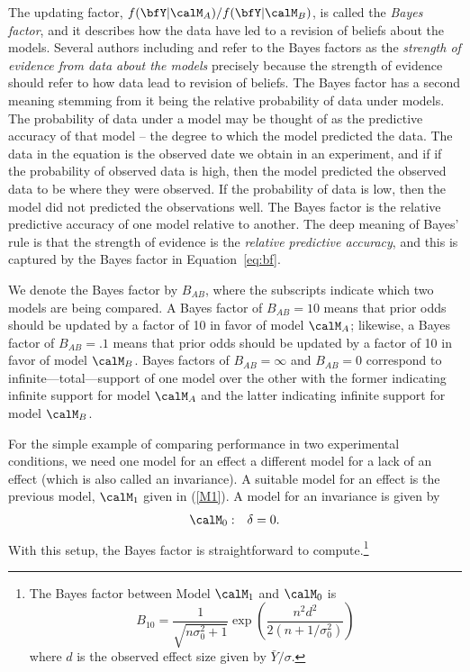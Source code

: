 The updating factor, $f(\bfY | \calM_A)/f(\bfY | \calM_B)$, is called the {\em Bayes factor}, and it  describes how the data have led to a revision of beliefs about the models.  Several authors including \cite{Jeffreys:1961} and  refer to the Bayes factors as the {\em strength of evidence from data about the models} precisely because the strength of evidence should refer to how data lead to revision of beliefs.  The Bayes factor has a second meaning stemming from it being the relative probability of data under models.  The probability of data under a model may be thought of as the predictive accuracy of that model -- the degree to which the model predicted the data.  The data in the equation is the observed date we obtain in an experiment, and if if the probability of observed data is high, then the model predicted the observed data to be where they were observed.  If the probability of data is low, then the model did not predicted the observations well.  The Bayes factor is the relative predictive accuracy of one model relative to another.  The deep meaning of Bayes' rule is that the strength of evidence is the \emph{relative predictive accuracy}, and this is captured by the Bayes factor in Equation~\ref{eq:bf}.

We denote the Bayes factor by $B_{AB}$, where the subscripts indicate which two models are being compared. 
A Bayes factor of $B_{AB}=10$ means that prior odds should be updated by a factor of 10 in favor of model $\calM_A$; likewise, a Bayes factor of $B_{AB}=.1$ means that prior odds should be updated by a factor of 10 in favor of model $\calM_B$. Bayes factors of $B_{AB}=\infty$ and $B_{AB}=0$ correspond to infinite---total---support of one model over the other with the former indicating infinite support for model $\calM_A$ and the latter indicating infinite support for model $\calM_B$.  

For the simple example of comparing performance in two experimental conditions, we need one model for an effect a different model for a lack of an effect (which is also called an invariance).  A suitable model for an effect is the previous model, $\calM_1$ given in (\ref{M1}).  A model for an invariance is given by 
\begin{eqnarray*}
\calM_0: && \delta = 0.
\end{eqnarray*}
With this setup, the Bayes factor is straightforward to compute.\footnote{The Bayes factor between Model $\calM_1$ and $\calM_0$ is 
\begin{equation} \label{workingBF}
B_{10} = \frac{1}{\sqrt{n\sigma_0^2+1}}\exp\left(\frac{n^2 d^2}{2(n+1/\sigma_0^2)}\right)
\end{equation}
where $d$ is the observed effect size given by $\bar{Y}/\sigma$.}

